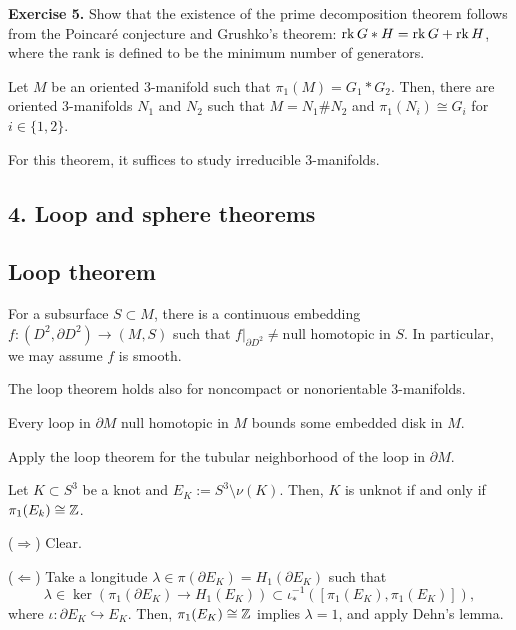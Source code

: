 \documentclass{../../small}
\begin{document}
\noindent\textbf{Exercise 5.} Show that the existence of the prime decomposition theorem follows from the Poincar\'e conjecture and Grushko's theorem: $\operatorname{rk} G*H=\operatorname{rk} G+\operatorname{rk} H$, where the rank is defined to be the minimum number of generators.

\begin{thm}
Let $M$ be an oriented 3-manifold such that $\pi_1(M)=G_1*G_2$.
Then, there are oriented 3-manifolds $N_1$ and $N_2$ such that $M=N_1\#N_2$ and $\pi_1(N_i)\cong G_i$ for $i\in\{1,2\}$.
\end{thm}
For this theorem, it suffices to study irreducible 3-manifolds.




\setcounter{section}{4}
\setcounter{subsection}{0}
\setcounter{thm}{0}
\subsection*{4. Loop and sphere theorems}
\subsection{Loop theorem}

\begin{thm}
For a subsurface $S\subset M$, there is a continuous embedding $f:(D^2,\partial D^2)\to(M,S)$ such that $f|_{\partial D^2}\ne\text{null homotopic in }S$.
In particular, we may assume $f$ is smooth.
\end{thm}

\begin{rmk*}
The loop theorem holds also for noncompact or nonorientable 3-manifolds.
\end{rmk*}

\begin{cor}
Every loop in $\partial M$ null homotopic in $M$ bounds some embedded disk in $M$.
\end{cor}
\begin{pf}
Apply the loop theorem for the tubular neighborhood of the loop in $\partial M$.
\end{pf}

\begin{thm}
Let $K\subset S^3$ be a knot and $E_K:=S^3\setminus\nu(K)$.
Then, $K$ is unknot if and only if $\pi_1(E_k)\cong\mathbb{Z}$.
\end{thm}
\begin{pf}
($\Rightarrow$)
Clear.

($\Leftarrow$)
Take a longitude $\lambda\in\pi(\partial E_K)=H_1(\partial E_K)$ such that
\[\lambda\in\ker(\pi_1(\partial E_K)\to H_1(E_K))\subset\iota_*^{-1}([\pi_1(E_K),\pi_1(E_K)]),\]
where $\iota:\partial E_K\hookrightarrow E_K$.
Then, $\pi_1(E_K)\cong\mathbb{Z}$ implies $\lambda=1$, and apply Dehn's lemma.
\end{pf}
\end{document}
